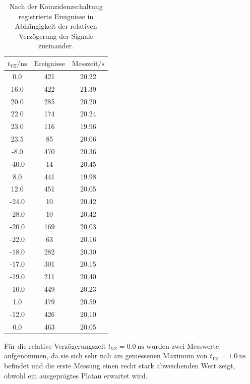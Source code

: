 \begin{table}
  \caption{Nach der Koinzidenzschaltung registrierte Ereignisse in Abhängigkeit der relativen Verzögerung der Signale zueinander.}
  \label{tab:koinzidenz}
  \centering
  \begin{tabular}{|S|S|S|}
    \toprule
    $t_{VZ}/\si{\nano\second}$ & $\text{Ereignisse}$ & $\text{Messzeit}/\si{\second}$ \\
     & 421 & 20.22 \\
    16.0 & 422 & 21.39  \\
    20.0 & 285 & 20.20 \\
    22.0 & 174 & 20.24 \\
    23.0 & 116 & 19.96 \\
    23.5 & 85 & 20.06 \\
    -8.0 & 470 & 20.36 \\
    -40.0 & 14 & 20.45 \\
    8.0 & 441 & 19.98 \\
    12.0 & 451 & 20.05 \\
    -24.0 & 10  & 20.42 \\
    -28.0 & 10 & 20.42 \\
    -20.0 & 169 & 20.03 \\
    -22.0 & 63 & 20.16 \\
    -18.0 & 282 &20.30 \\
    -17.0 & 301 & 20.15 \\
    -19.0 & 211 & 20.40 \\
    -10.0 & 449 & 20.23 \\
    1.0 & 479 & 20.59 \\
    -12.0 & 426 & 20.10 \\
    0.0 & 463 & 20.05 \\
    \bottomrule
  \end{tabular}
\end{table}

Für die relative Verzögerungszeit $t_{VZ}= \SI{0.0}{\nano\second}$ wurden zwei Messwerte aufgenommen, da sie sich sehr nah am gemessenen Maximum von $t_{VZ}= \SI{1.0}{\nano\second}$ befindet und die erste Messung einen recht stark abweichenden Wert zeigt, obwohl ein ausgeprägtes Platau erwartet wird.


